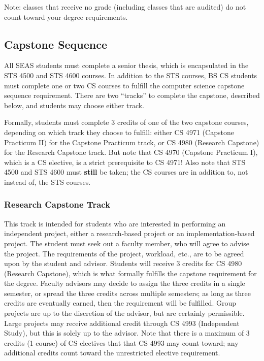 \documentclass[10pt,letter,twocolumn]{book}
\begin{document}
Note: classes that receive no grade (including classes that are
audited) do not count toward your degree requirements.

\subsection{Capstone Sequence}
\label{capstone-section}

All SEAS students must complete a senior thesis, which is encapsulated
in the STS 4500 and STS 4600 courses.  In addition to the STS courses,
BS CS students must complete one or two CS courses to fulfill the
computer science capstone sequence requirement.  There are two
``tracks'' to complete the capstone, described below, and students may
choose either track.

Formally, students must complete 3 credits of one of the two capstone
courses, depending on which track they choose to
fulfill: either CS 4971 (Capstone Practicum II) for the Capstone
Practicum track, or CS 4980 (Research Capstone) for the Research
Capstone track.  But note that CS 4970 (Capstone Practicum I), which
is a CS elective, is a strict prerequisite to CS 4971!  Also note
that STS 4500 and STS 4600 must {\bf still} be taken; the CS courses
are in addition to, not instead of, the STS courses.

\subsubsection{Research Capstone Track}

This track is intended for students who are interested in performing
an independent project, either a research-based project or an
implementation-based project.  The student must seek out a faculty
member, who will agree to advise the project.  The requirements of the
project, workload, etc., are to be agreed upon by the student and
advisor.  Students will receive 3 credits for CS 4980 (Research
Capstone), which is what formally fulfills the capstone requirement
for the degree.  Faculty advisors may decide to assign the three
credits in a single semester, or spread the three credits across
multiple semesters; as long as three credits are eventually earned,
then the requirement will be fulfilled.  Group projects are up to the
discretion of the advisor, but are certainly permissible.  Large
projects may receive additional credit through CS 4993 (Independent
Study), but this is solely up to the advisor.  Note that there is a
maximum of 3 credits (1 course) of CS electives that that CS 4993 may
count toward; any additional credits count toward the unrestricted
elective requirement.
\end{document}
